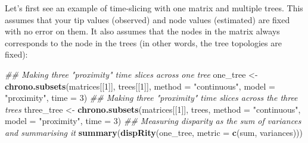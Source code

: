 \documentclass[
]{book}
\newenvironment{Shaded}{\begin{snugshade}}{\end{snugshade}}
\newcommand{\CommentTok}[1]{\textcolor[rgb]{0.56,0.35,0.01}{\textit{#1}}}
\newcommand{\ControlFlowTok}[1]{\textcolor[rgb]{0.13,0.29,0.53}{\textbf{#1}}}
\newcommand{\DataTypeTok}[1]{\textcolor[rgb]{0.13,0.29,0.53}{#1}}
\newcommand{\DecValTok}[1]{\textcolor[rgb]{0.00,0.00,0.81}{#1}}
\newcommand{\KeywordTok}[1]{\textcolor[rgb]{0.13,0.29,0.53}{\textbf{#1}}}
\newcommand{\NormalTok}[1]{#1}
\newcommand{\OperatorTok}[1]{\textcolor[rgb]{0.81,0.36,0.00}{\textbf{#1}}}
\newcommand{\OtherTok}[1]{\textcolor[rgb]{0.56,0.35,0.01}{#1}}
\newcommand{\StringTok}[1]{\textcolor[rgb]{0.31,0.60,0.02}{#1}}
\begin{document}
\begin{Shaded}
\end{Shaded}

Let's first see an example of time-slicing with one matrix and multiple trees.
This assumes that your tip values (observed) and node values (estimated) are fixed with no error on them.
It also assumes that the nodes in the matrix always corresponds to the node in the trees (in other words, the tree topologies are fixed):

\begin{Shaded}
\begin{Highlighting}[]
\CommentTok{\#\# Making three "proximity" time slices across one tree}
\NormalTok{one\_tree \textless{}{-}}\StringTok{ }\KeywordTok{chrono.subsets}\NormalTok{(matrices[[}\DecValTok{1}\NormalTok{]], trees[[}\DecValTok{1}\NormalTok{]],}
                           \DataTypeTok{method =} \StringTok{"continuous"}\NormalTok{,}
                           \DataTypeTok{model =} \StringTok{"proximity"}\NormalTok{, }\DataTypeTok{time =} \DecValTok{3}\NormalTok{)}
\CommentTok{\#\# Making three "proximity" time slices across the three trees}
\NormalTok{three\_tree \textless{}{-}}\StringTok{ }\KeywordTok{chrono.subsets}\NormalTok{(matrices[[}\DecValTok{1}\NormalTok{]], trees,}
                             \DataTypeTok{method =} \StringTok{"continuous"}\NormalTok{,}
                             \DataTypeTok{model =} \StringTok{"proximity"}\NormalTok{, }\DataTypeTok{time =} \DecValTok{3}\NormalTok{)}
\CommentTok{\#\# Measuring disparity as the sum of variances and summarising it}
\KeywordTok{summary}\NormalTok{(}\KeywordTok{dispRity}\NormalTok{(one\_tree, }\DataTypeTok{metric =} \KeywordTok{c}\NormalTok{(sum, variances)))}
\end{Highlighting}
\end{Shaded}
\end{document}
